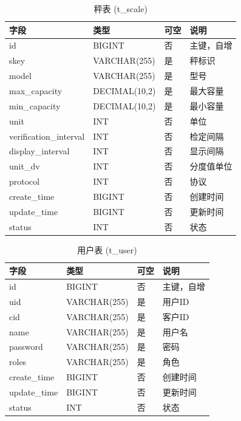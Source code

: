 \documentclass{xduugmr}
\begin{document}
\begin{table}[H]
    \centering
    \caption{秤表 (t\_scale)}
    \begin{tabular}{|l|l|l|l|}
        \hline
        \textbf{字段} & \textbf{类型} & \textbf{可空} & \textbf{说明} \\
        \hline
        id & BIGINT & 否 & 主键，自增 \\
        skey & VARCHAR(255) & 是 & 秤标识 \\
        model & VARCHAR(255) & 是 & 型号 \\
        max\_capacity & DECIMAL(10,2) & 是 & 最大容量 \\
        min\_capacity & DECIMAL(10,2) & 是 & 最小容量 \\
        unit & INT & 否 & 单位 \\
        verification\_interval & INT & 否 & 检定间隔 \\
        display\_interval & INT & 否 & 显示间隔 \\
        unit\_dv & INT & 否 & 分度值单位 \\
        protocol & INT & 否 & 协议 \\
        create\_time & BIGINT & 否 & 创建时间 \\
        update\_time & BIGINT & 否 & 更新时间 \\
        status & INT & 否 & 状态 \\
        \hline
    \end{tabular}
\end{table}

\begin{table}[H]
    \centering
    \caption{用户表 (t\_user)}
    \begin{tabular}{|l|l|l|l|}
        \hline
        \textbf{字段} & \textbf{类型} & \textbf{可空} & \textbf{说明} \\
        \hline
        id & BIGINT & 否 & 主键，自增 \\
        uid & VARCHAR(255) & 是 & 用户ID \\
        cid & VARCHAR(255) & 是 & 客户ID \\
        name & VARCHAR(255) & 是 & 用户名 \\
        password & VARCHAR(255) & 是 & 密码 \\
        roles & VARCHAR(255) & 是 & 角色 \\
        create\_time & BIGINT & 否 & 创建时间 \\
        update\_time & BIGINT & 否 & 更新时间 \\
        status & INT & 否 & 状态 \\
        \hline
    \end{tabular}
\end{table}
\end{document}
